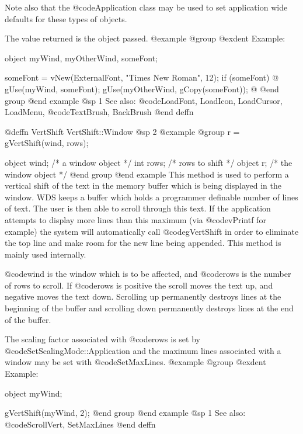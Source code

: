 Note also that the @code{Application} class may be used to set application
wide defaults for these types of objects.

The value returned is the object passed.
@example
@group
@exdent Example:

object  myWind, myOtherWind, someFont;

someFont = vNew(ExternalFont, "Times New Roman", 12);
if (someFont)  @{
        gUse(myWind, someFont);
        gUse(myOtherWind, gCopy(someFont));
@}
@end group
@end example
@sp 1
See also:  @code{LoadFont, LoadIcon, LoadCursor, LoadMenu,}
        @code{TextBrush, BackBrush}
@end deffn








@deffn {VertShift} VertShift::Window
@sp 2
@example
@group
r = gVertShift(wind, rows);

object  wind;   /*  a window object     */
int     rows;   /*  rows to shift       */
object  r;      /*  the window object   */
@end group
@end example
This method is used to perform a vertical shift of the text in the
memory buffer which is being displayed in the window.  WDS keeps
a buffer which holds a programmer definable number of lines of text.
The user is then able to scroll through this text.  If the application
attempts to display more lines than this maximum (via @code{vPrintf}
for example) the system will automatically call @code{gVertShift} in
order to eliminate the top line and make room for the new line being
appended.  This method is mainly used internally.

@code{wind} is the window which is to be affected, and @code{rows} is the
number of rows to scroll.  If @code{rows} is positive the scroll moves
the text up, and negative moves the text down.  Scrolling up permanently
destroys lines at the beginning of the buffer and scrolling down
permanently destroys lines at the end of the buffer.

The scaling factor associated with @code{rows} is set by
@code{SetScalingMode::Application} and the maximum lines associated with
a window may be set with @code{SetMaxLines}.
@example
@group
@exdent Example:

object  myWind;

gVertShift(myWind, 2);
@end group
@end example
@sp 1
See also:  @code{ScrollVert, SetMaxLines}
@end deffn








